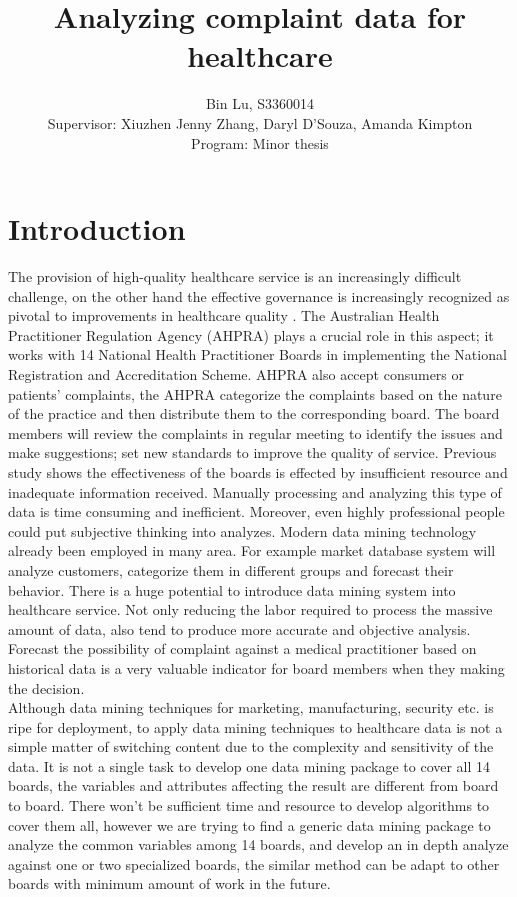 \documentclass[a4paper,11pt]{article}
\title{Analyzing complaint data for healthcare}
\author{Bin Lu, S3360014\\Supervisor: Xiuzhen Jenny Zhang, Daryl D'Souza, Amanda Kimpton\\Program: Minor thesis}
\begin{document}
\maketitle
\section{Introduction}
The provision of high-quality healthcare service is an increasingly difficult challenge, on the other hand the effective governance is increasingly recognized as pivotal to improvements in healthcare quality \cite{ref6}. The Australian Health Practitioner Regulation Agency (AHPRA) plays a crucial role in this aspect; it works with 14 National Health Practitioner Boards in implementing the National Registration and Accreditation Scheme. AHPRA also accept consumers or patients’ complaints, the AHPRA categorize the complaints based on the nature of the practice and then distribute them to the corresponding board. The board members will review the complaints in regular meeting to identify the issues and make suggestions; set new standards to improve the quality of service. Previous study\cite{ref5} shows the effectiveness of the boards is effected by insufficient resource and inadequate information received. Manually processing and analyzing this type of data is time consuming and inefficient. Moreover, even highly professional people could put subjective thinking into analyzes. Modern data mining technology already been employed in many area. For example market database system will analyze customers, categorize them in different groups and forecast their behavior. There is a huge potential to introduce data mining system into healthcare service. Not only reducing the labor required to process the massive amount of data, also tend to produce more accurate and objective analysis. Forecast the possibility of complaint against a medical practitioner based on historical data is a very valuable indicator for board members when they making the decision.\\
Although data mining techniques for marketing, manufacturing, security etc. is ripe for deployment\cite{ref12}\cite{ref11}, to apply data mining techniques to healthcare data is not a simple matter of switching content due to the complexity and sensitivity of the data. It is not a single task to develop one data mining package to cover all 14 boards, the variables and attributes affecting the result are different from board to board.\cite{ref1}\cite{ref2}\cite{ref3}\cite{ref4} There won’t be sufficient time and resource to develop algorithms to cover them all, however we are trying to find a generic data mining package to analyze the common variables among 14 boards, and develop an in depth analyze against one or two specialized boards, the similar method can be adapt to other boards with minimum amount of work in the future.
\end{document}
